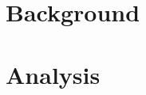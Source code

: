 



\frontmatter{}

%



\pagebreak

\setcounter{tocdepth}{2}


\mainmatter{}


%

%

\chapter{Background}\label{background}


%

\chapter{Analysis}\label{analysis}


%

%

